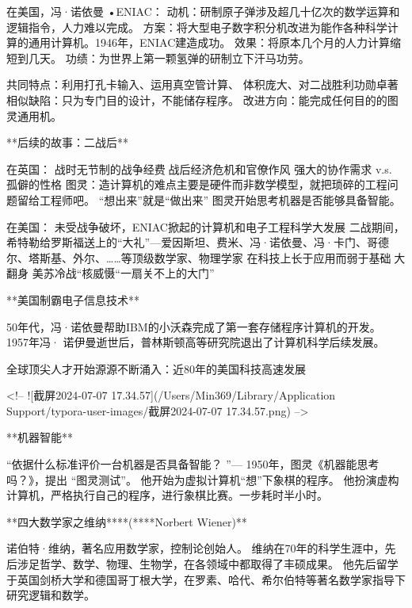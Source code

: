 在美国，冯·诺依曼 •ENIAC：
动机：研制原子弹涉及超几十亿次的数学运算和逻辑指令，人力难以完成。
方案：将大型电子数字积分机改进为能作各种科学计算的通用计算机。1946年，ENIAC建造成功。
效果：将原本几个月的人力计算缩短到几天。
功绩：为世界上第一颗氢弹的研制立下汗马功劳。



共同特点：利用打孔卡输入、运用真空管计算、
		   体积庞大、对二战胜利功勋卓著
相似缺陷：只为专门目的设计，不能储存程序。
改进方向：能完成任何目的的图灵通用机。



**后续的故事：二战后**



在英国：
战时无节制的战争经费战后经济危机和官僚作风
强大的协作需求 v.s. 孤僻的性格
图灵：造计算机的难点主要是硬件而非数学模型，就把琐碎的工程问题留给工程师吧。
“想出来”就是“做出来”
图灵开始思考机器是否能够具备智能。



在美国：
未受战争破坏，ENIAC掀起的计算机和电子工程科学大发展
二战期间，希特勒给罗斯福送上的“大礼”---爱因斯坦、费米、冯·诺依曼、冯·卡门、哥德尔、塔斯基、外尔、……等顶级数学家、物理学家
在科技上长于应用而弱于基础大翻身
美苏冷战“核威慑“一扇关不上的大门” 



**美国制霸电子信息技术**

50年代，冯·诺依曼帮助IBM的小沃森完成了第一套存储程序计算机的开发。
1957年冯· 诺伊曼逝世后，普林斯顿高等研究院退出了计算机科学后续发展。



全球顶尖人才开始源源不断涌入：近80年的美国科技高速发展

<!-- ![截屏2024-07-07 17.34.57](/Users/Min369/Library/Application Support/typora-user-images/截屏2024-07-07 17.34.57.png) -->



**机器智能**

“依据什么标准评价一台机器是否具备智能？ ”--- 1950年，图灵《机器能思考吗？》，提出 “图灵测试”。
他开始为虚拟计算机“想”下象棋的程序。
他扮演虚构计算机，严格执行自己的程序，进行象棋比赛。一步耗时半小时。



**四大数学家之维纳****(****Norbert Wiener)**

诺伯特·维纳，著名应用数学家，控制论创始人。
维纳在70年的科学生涯中，先后涉足哲学、数学、物理、生物学，在各领域中都取得了丰硕成果。
他先后留学于英国剑桥大学和德国哥丁根大学，在罗素、哈代、希尔伯特等著名数学家指导下研究逻辑和数学。



